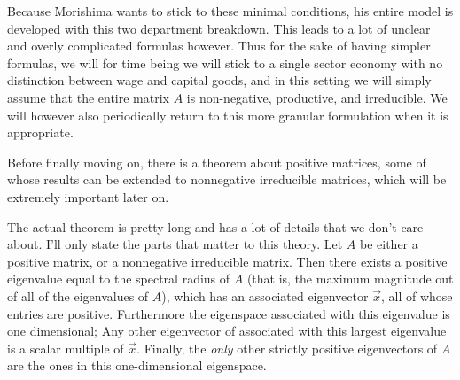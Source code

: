 Because Morishima wants to stick to these minimal conditions, his entire model is developed with this two department breakdown. This leads to a lot of unclear and overly complicated formulas however. Thus for the sake of having simpler formulas, we will for time being we will stick to a single sector economy with no distinction between wage and capital goods, and in this setting we will simply assume that the entire matrix $A$ is non-negative, productive, and irreducible. We will however also periodically return to this more granular formulation when it is appropriate.
\par Before finally moving on, there is a theorem about positive matrices, some of whose results can be extended to nonnegative irreducible matrices, which will be extremely important later on.
\begin{theorem}
	The actual theorem is pretty long and has a lot of details that we don't care about. I'll only state the parts that matter to this theory. Let $A$ be either a positive matrix, or a nonnegative irreducible matrix. Then there exists a positive eigenvalue equal to the spectral radius of $A$ (that is, the maximum magnitude out of all of the eigenvalues of $A$), which has an associated eigenvector $\vec{x}$, all of whose entries are positive. Furthermore the eigenspace associated with this eigenvalue is one dimensional; Any other eigenvector of associated with this largest eigenvalue is a scalar multiple of $\vec{x}$. Finally, the \emph{only} other strictly positive eigenvectors of $A$ are the ones in this one-dimensional eigenspace. 
\end{theorem}
